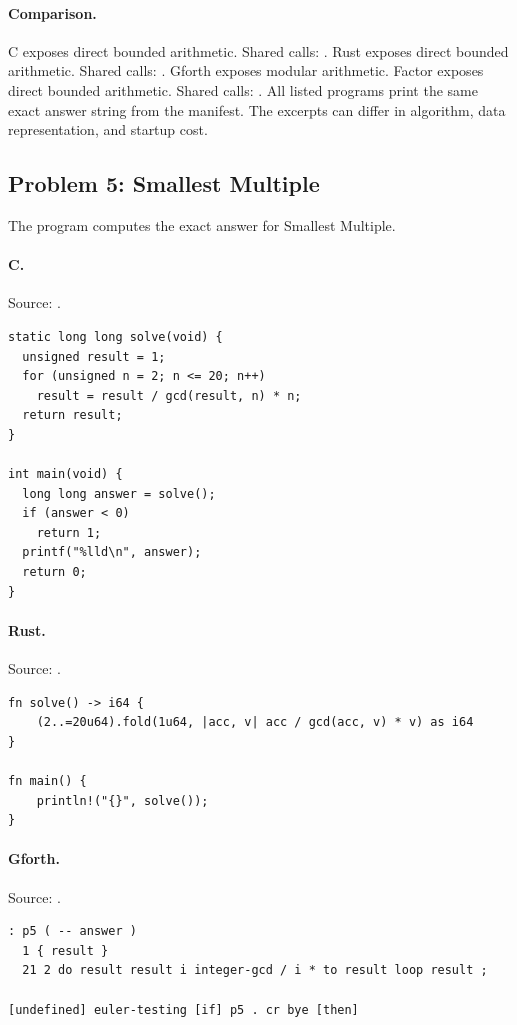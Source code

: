 \paragraph{Comparison.}
C exposes direct bounded arithmetic. Shared calls: \texttt{}. Rust exposes direct bounded arithmetic. Shared calls: \texttt{}. Gforth exposes modular arithmetic. Factor exposes direct bounded arithmetic. Shared calls: \texttt{}.
All listed programs print the same exact answer string from the manifest. The excerpts can differ in algorithm, data representation, and startup cost.

\subsection{Problem 5: Smallest Multiple}
\label{walkthrough:p5}
The program computes the exact answer for Smallest Multiple.

\paragraph{C.} Source: .
\begin{lstlisting}
static long long solve(void) {
  unsigned result = 1;
  for (unsigned n = 2; n <= 20; n++)
    result = result / gcd(result, n) * n;
  return result;
}

int main(void) {
  long long answer = solve();
  if (answer < 0)
    return 1;
  printf("%lld\n", answer);
  return 0;
}
\end{lstlisting}

\paragraph{Rust.} Source: .
\begin{lstlisting}
fn solve() -> i64 {
    (2..=20u64).fold(1u64, |acc, v| acc / gcd(acc, v) * v) as i64
}

fn main() {
    println!("{}", solve());
}
\end{lstlisting}

\paragraph{Gforth.} Source: .
\begin{lstlisting}
: p5 ( -- answer )
  1 { result }
  21 2 do result result i integer-gcd / i * to result loop result ;

[undefined] euler-testing [if] p5 . cr bye [then]
\end{lstlisting}

